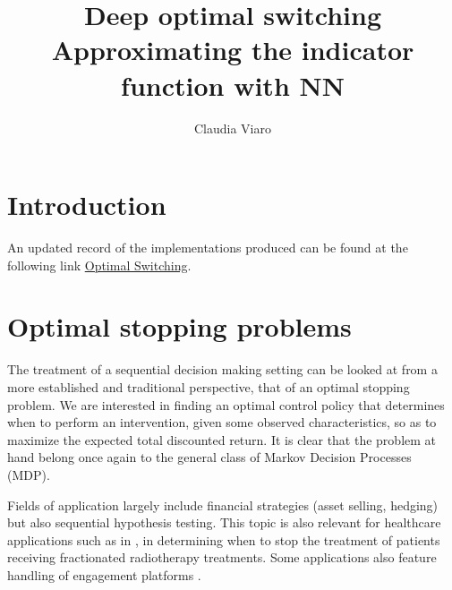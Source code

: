 \documentclass{article}
\date{\displaydate{date}}
\author[1]{Claudia Viaro}
\title{Deep optimal switching\\[1ex]

\large{Approximating the indicator function with NN}}
\begin{document}
\maketitle
\displaydate{}

\tableofcontents
\newpage
\section{Introduction}
An updated record of the implementations produced can be found at the following link \href{https://github.com/claudia-viaro/optimal_switching}{Optimal Switching}.


\section{Optimal stopping problems} \label{OptStop}
The treatment of a sequential decision making setting can be looked at from a more established and traditional perspective, that of an optimal stopping problem. We are interested in finding an optimal control policy that determines when to perform an intervention, given some observed characteristics, so as to maximize the expected total discounted return. It is clear that the problem at hand belong once again to the general class of Markov Decision Processes (MDP). 

\medskip
Fields of application largely include financial strategies (asset selling, hedging) but also sequential hypothesis testing. This topic is also relevant for healthcare applications such as in \cite{ajdari2019towards}, in determining when to stop the treatment of patients receiving fractionated radiotherapy treatments. Some applications also feature handling of engagement platforms \citep{liyanage2019automating}. 
\end{document}
